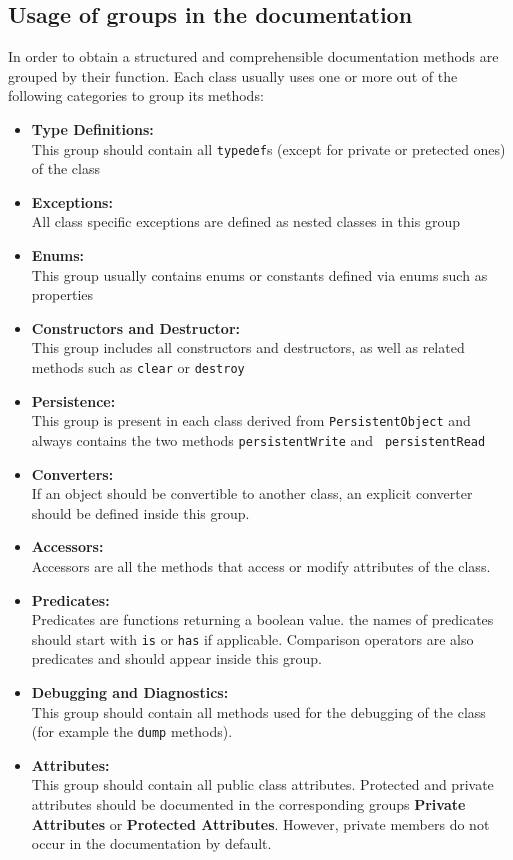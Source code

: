 \documentclass[a4paper,10pt]{article}
\begin{document}
\subsection{Usage of groups in the documentation}

In order to obtain a structured and comprehensible documentation methods are
grouped by their function. Each class usually uses one or more out of the
following categories to group its methods:
\begin{itemize}
	\item {\bf Type Definitions:}\\
		This group should contain all {\tt typedef}s (except for private or pretected
		ones) of the class
	\item {\bf Exceptions:}\\
		All class specific exceptions are defined as nested classes in this group
	\item {\bf Enums:}\\
		This group usually contains enums or constants defined via enums such as
		properties
	\item {\bf Constructors and Destructor:}\\
		This group includes all constructors and destructors, as well as related
		methods such as {\tt clear} or {\tt destroy}
	\item {\bf Persistence:}\\
		This group is present in each class derived from {\tt PersistentObject}
		and always contains the two methods {\tt persistentWrite} and {\tt
		persistentRead}
	\item {\bf Converters:}\\
		If an object should be convertible to another class, an explicit
		converter should be defined inside this group.
	\item {\bf Accessors:}\\
		Accessors are all the methods that access or modify attributes of the
		class.
	\item {\bf Predicates:}\\
		Predicates are functions returning a boolean value. the names of
		predicates should start with {\tt is} or {\tt has} if applicable.
		Comparison operators are also predicates and should appear inside
		this group.
	\item {\bf Debugging and Diagnostics:}\\
		This group should contain all methods used for the debugging of the class
		(for example the {\tt dump} methods).
	\item {\bf Attributes:}\\	
		This group should contain all public class attributes. Protected and
		private attributes should be documented in the corresponding groups
		{\bf Private Attributes} or {\bf Protected Attributes}. However, private 
		members do not occur in the documentation by default.
\end{itemize}
\end{document}
